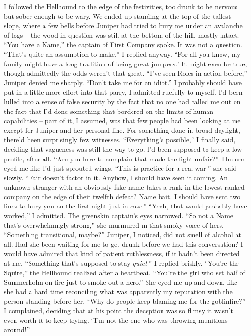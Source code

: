 \documentclass[12pt, openany]{book}
\begin{document}
I followed the Hellhound to the edge of the festivities, too drunk to be nervous but sober enough to be wary. We ended up standing at the top of the tallest slope, where a few bells before Juniper had tried to bury me under an avalanche of logs – the wood in question was still at the bottom of the hill, mostly intact.
“You have a Name,” the captain of First Company spoke.
It was not a question.
“That’s quite an assumption to make,” I replied anyway. “For all you know, my family might have a long tradition of being great jumpers.”
It might even be true, though admittedly the odds weren’t that great.
“I’ve seen Roles in action before,” Juniper denied me sharply. “Don’t take me for an idiot.”
I probably should have put in a little more effort into that parry, I admitted ruefully to myself. I’d been lulled into a sense of false security by the fact that no one had called me out on the fact that I’d done something that bordered on the limits of human capabilities – part of it, I assumed, was that few people had been looking at me except for Juniper and her personal line. For something done in broad daylight, there’d been surprisingly few witnesses.
“Everything’s possible,” I finally said, deciding that vagueness was still the way to go. I’d been supposed to keep a low profile, after all. “Are you here to complain that made the fight unfair?”
The orc eyed me like I’d just sprouted wings.
“This is practice for a real war,” she said slowly. “Fair doesn’t factor in it. Anyhow, I should have seen it coming. An unknown stranger with an obviously fake name takes a rank in the lowest-ranked company on the edge of their twelfth defeat? Name bait. I should have sent two lines to bury you on the first night just in case.”
“Yeah, that would probably have worked,” I admitted.
The greenskin captain’s eyes narrowed.
“So not a Name that’s overwhelmingly strong,” she murmured in that smoky voice of hers. “Something transitional, maybe?”
Juniper, I noticed, did not smell of alcohol at all. Had she been waiting for me to get drunk before we had this conversation? I would have admired that kind of patient ruthlessness, if it hadn’t been directed at me.
“Something that’s supposed to stay \textit{quiet},” I replied briskly.
“You’re the Squire,” the Hellhound realized after a heartbeat. “You’re the girl who set half of Summerholm on fire just to smoke out a hero.”
She eyed me up and down, like she had a hard time reconciling what was apparently my reputation with the person standing before her.
“Why do people keep blaming me for the goblinfire?” I complained, deciding that at his point the deception was so flimsy it wasn’t even worth it to keep trying. “I’m not the one who was throwing munitions around!”
\end{document}

